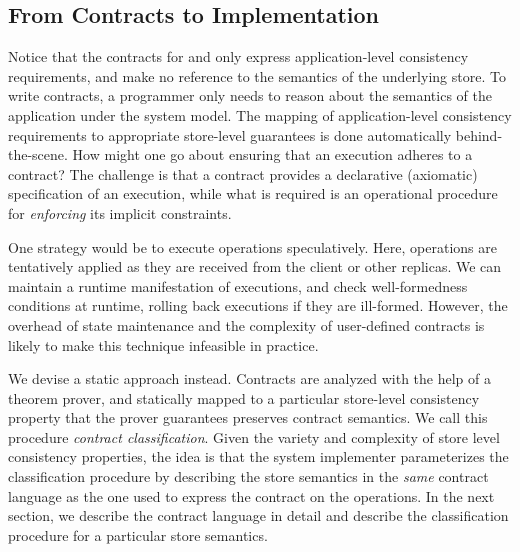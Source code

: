 \subsection{From Contracts to Implementation}

Notice that the contracts for  and  only express
application-level consistency requirements, and make no reference to the
semantics of the underlying store. To write contracts, a programmer only needs
to reason about the semantics of the application under the \name system model.
The mapping of application-level consistency requirements to appropriate
store-level guarantees is done automatically behind-the-scene. How might one go
about ensuring that an execution adheres to a contract? The challenge is that a
contract provides a declarative (axiomatic) specification of an execution,
while what is required is an operational procedure for \emph{enforcing} its
implicit constraints.

One strategy would be to execute operations speculatively.  Here, operations
are tentatively applied as they are received from the client or other replicas.
We can maintain a runtime manifestation of executions, and check
well-formedness conditions at runtime, rolling back executions if they are
ill-formed. However, the overhead of state maintenance and the complexity of
user-defined contracts is likely to make this technique infeasible in practice.

We devise a static approach instead. Contracts are analyzed with the help of a
theorem prover, and statically mapped to a particular store-level consistency
property that the prover guarantees preserves contract semantics. We call this
procedure \emph{contract classification}. Given the variety and complexity of
store level consistency properties, the idea is that the system implementer
parameterizes the classification procedure by describing the store semantics in
the \emph{same} contract language as the one used to express the contract on
the operations. In the next section, we describe the contract language in
detail and describe the classification procedure for a particular store
semantics.
